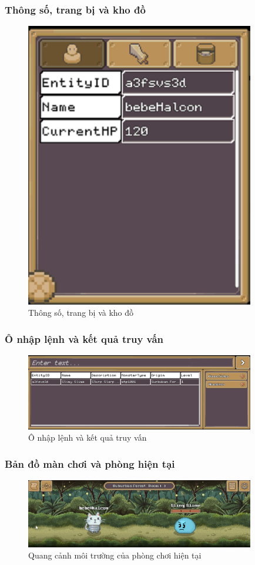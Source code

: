 \subsubsection{Thông số, trang bị và kho đồ}
\begin{figure}[H]
	\centering
	\includegraphics[width=10cm]{Images/Inventory.png}
	\vspace{0.5cm}
	\caption{Thông số, trang bị và kho đồ}
\end{figure}
\subsubsection{Ô nhập lệnh và kết quả truy vấn}
\begin{figure}[H]
	\centering
	\includegraphics[width=10cm]{Images/CommandBox.png}
	\vspace{0.5cm}
	\caption{Ô nhập lệnh và kết quả truy vấn}
\end{figure}
\subsubsection{Bản đồ màn chơi và phòng hiện tại}
\begin{figure}[H]
	\centering
	\includegraphics[width=10cm]{Images/CurrentRoom.png}
	\vspace{0.5cm}
	\caption{Quang cảnh môi trường của phòng chơi hiện tại}
\end{figure}
